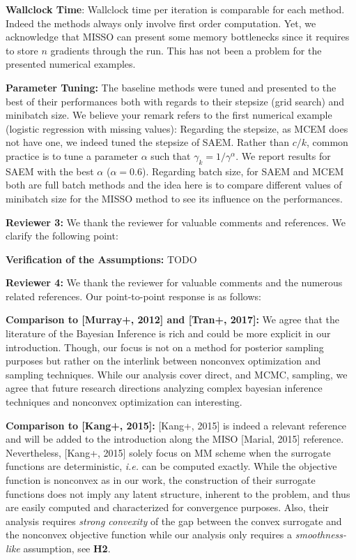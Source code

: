\documentclass{article}
\begin{document}
\textbf{Wallclock Time}:
Wallclock time per iteration is comparable for each method. Indeed the methods always only involve first order computation. Yet, we acknowledge that MISSO can present some memory bottlenecks since it requires to store $n$ gradients through the run. This has not been a problem for the presented numerical examples.

\textbf{Parameter Tuning:}
The baseline methods were tuned and presented to the best of their performances both with regards to their stepsize (grid search) and minibatch size.
We believe your remark refers to the first numerical example (logistic regression with missing values): Regarding the stepsize, as MCEM does not have one, we indeed tuned the stepsize of SAEM. Rather than $c/k$, common practice is to tune a parameter $\alpha$ such that $\gamma_k = 1/\gamma^{\alpha}$. We report results for SAEM with the best $\alpha$ ($\alpha = 0.6$). Regarding batch size, for SAEM and MCEM both are full batch methods and the idea here is to compare different values of minibatch size for the MISSO method to see its influence on the performances.



\textbf{\textcolor{yellow!80!black}{Reviewer 3:}} We thank the reviewer for valuable comments and references. We clarify the following point:

\textbf{Verification of the Assumptions:} {\color{red} TODO }



\textbf{\textcolor{green!50!black}{Reviewer 4:}} We thank the reviewer for valuable comments and the numerous related references. Our point-to-point response is as follows:

\textbf{Comparison to [Murray+, 2012] and [Tran+, 2017]:} We agree that the literature of the Bayesian Inference is rich and could be more explicit in our introduction. Though, our focus is not on a method for posterior sampling purposes but rather on the interlink between nonconvex optimization and sampling techniques. While our analysis cover direct, and MCMC, sampling, we agree that future research directions analyzing complex bayesian inference techniques and nonconvex optimization can interesting.

\textbf{Comparison to [Kang+, 2015]:} [Kang+, 2015] is indeed a relevant reference and will be added to the introduction along the MISO [Marial, 2015] reference.
Nevertheless, [Kang+, 2015] solely focus on MM scheme when the surrogate functions are deterministic, \textit{i.e.} can be computed exactly. 
While the objective function is nonconvex as in our work, the construction of their surrogate functions does not imply any latent structure, inherent to the problem, and thus are easily computed and characterized for convergence purposes. Also, their analysis requires \emph{strong convexity} of the gap between the convex surrogate and the nonconvex objective function while our analysis only requires a \emph{smoothness-like} assumption, see \textbf{H2}.

\end{document}
